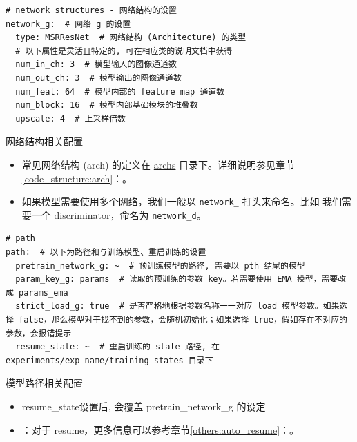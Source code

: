 \documentclass[../main.tex]{subfiles}
\begin{document}
\begin{verbatim}
# network structures - 网络结构的设置
network_g:  # 网络 g 的设置
  type: MSRResNet  # 网络结构 (Architecture) 的类型
  # 以下属性是灵活且特定的, 可在相应类的说明文档中获得
  num_in_ch: 3  # 模型输入的图像通道数
  num_out_ch: 3  # 模型输出的图像通道数
  num_feat: 64  # 模型内部的 feature map 通道数
  num_block: 16  # 模型内部基础模块的堆叠数
  upscale: 4  # 上采样倍数
\end{verbatim}

\begin{exampleBox}[righthand ratio=0.00, sidebyside, sidebyside align=center, lower separated=false]{网络结构相关配置}
    \begin{itemize}
        \item 常见网络结构 (arch) 的定义在 \href{https://github.com/XPixelGroup/BasicSR/tree/master/basicsr/archs}{archs} 目录下。详细说明参见章节\ref{code_structure:arch}：。
        \item 如果模型需要使用多个网络，我们一般以 \texttt{network\_} 打头来命名。比如 我们需要一个 discriminator，命名为  \texttt{network\_d}。
    \end{itemize}
\end{exampleBox}

\begin{verbatim}
# path
path:  # 以下为路径和与训练模型、重启训练的设置
  pretrain_network_g: ~  # 预训练模型的路径, 需要以 pth 结尾的模型
  param_key_g: params  # 读取的预训练的参数 key。若需要使用 EMA 模型，需要改成 params_ema
  strict_load_g: true  # 是否严格地根据参数名称一一对应 load 模型参数。如果选择 false，那么模型对于找不到的参数，会随机初始化；如果选择 true，假如存在不对应的参数，会报错提示
  resume_state: ~  # 重启训练的 state 路径, 在 experiments/exp_name/training_states 目录下
\end{verbatim}

\begin{exampleBox}[righthand ratio=0.00, sidebyside, sidebyside align=center, lower separated=false]{模型路径相关配置}
    \begin{itemize}
        \item resume\_state设置后, 会覆盖 pretrain\_network\_g 的设定
        \item ：对于 resume，更多信息可以参考章节\ref{others:auto_resume}：。
    \end{itemize}
\end{exampleBox}
\end{document}
